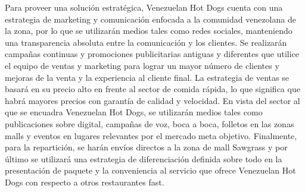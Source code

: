 Para proveer una solución estratégica, Venezuelan Hot Dogs cuenta con una estrategia de marketing y comunicación enfocada a la comunidad venezolana de la zona, por lo que se utilizarán medios tales como redes sociales, manteniendo una transparencia absoluta entre la comunicación y los clientes. Se realizarán campañas continuas y promociones publicitarias antiguas y diferentes que utilice el equipo de ventas y marketing para lograr un mayor número de clientes y mejoras de la venta y la experiencia al cliente final.
La estrategia de ventas se basará en su precio alto en frente al sector de comida rápida, lo que significa que habrá mayores precios con garantía de calidad y velocidad. En vista del sector al que se encuadra Venezuelan Hot Dogs, se utilizarán medios tales como publicaciones sobre digital, campañas de voz, boca a boca, folletos en las zonas malls y eventos en lugares relevantes por el mercado meta objetivo. Finalmente, para la repartición, se harán envíos directos a la zona de mall Sawgrass y por último se utilizará una estrategia de diferenciación definida sobre todo en la presentación de paquete y la conveniencia al servicio que ofrece Venezuelan Hot Dogs con respecto a otros restaurantes fast.
